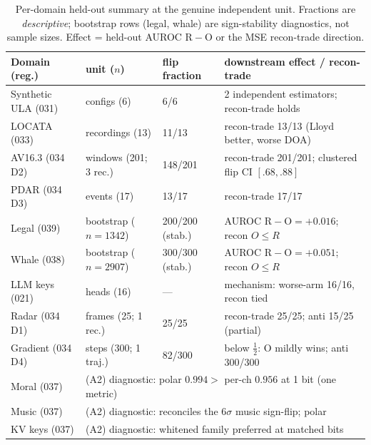 \documentclass[10pt]{article} %
\theoremstyle{remark}
\begin{document}
\begin{table}[h]\footnotesize\centering
\caption{Per-domain held-out summary at the genuine independent unit. Fractions are
\emph{descriptive}; bootstrap rows (legal, whale) are sign-stability diagnostics, not sample
sizes. Effect = held-out AUROC $\mathrm R-\mathrm O$ or the MSE recon-trade direction.}
\label{tab:perdomain}
\begin{tabular}{@{}llll@{}}
\toprule
Domain (reg.) & unit ($n$) & flip fraction & downstream effect / recon-trade \\
\midrule
Synthetic ULA (031) & configs (6) & 6/6 & 2 independent estimators; recon-trade holds \\
LOCATA (033) & recordings (13) & 11/13 & recon-trade 13/13 (Lloyd better, worse DOA) \\
AV16.3 (034\,D2) & windows (201; 3 rec.) & 148/201 & recon-trade 201/201; clustered flip CI $[.68,.88]$ \\
PDAR (034\,D3) & events (17) & 13/17 & recon-trade 17/17 \\
Legal (039) & bootstrap ($n{=}1342$) & 200/200 (stab.) & AUROC $\mathrm R{-}\mathrm O={+}0.016$; recon $O{\le}R$ \\
Whale (038) & bootstrap ($n{=}2907$) & 300/300 (stab.) & AUROC $\mathrm R{-}\mathrm O={+}0.051$; recon $O{\le}R$ \\
\midrule
LLM keys (021) & heads (16) & --- & mechanism: worse-arm 16/16, recon tied \\
Radar (034\,D1) & frames (25; 1 rec.) & 25/25 & recon-trade 25/25; anti 15/25 (partial) \\
Gradient (034\,D4) & steps (300; 1 traj.) & 82/300 & below $\tfrac12$: O mildly wins; anti 300/300 \\
\midrule
Moral (037) & \multicolumn{3}{l}{(A2) diagnostic: polar $0.994>$ per-ch $0.956$ at 1 bit (one metric)} \\
Music (037) & \multicolumn{3}{l}{(A2) diagnostic: reconciles the $6\sigma$ music sign-flip; polar} \\
KV keys (037) & \multicolumn{3}{l}{(A2) diagnostic: whitened family preferred at matched bits} \\
\bottomrule
\end{tabular}
\end{table}
\end{document}
